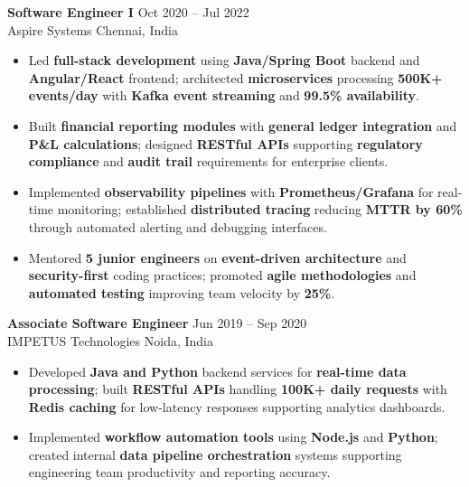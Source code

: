 \documentclass[letterpaper,10pt]{article}
\newcommand{\resumeItem}[1]{\item\small #1}
\newcommand{\resumeSubheading}[4]{
  \vspace{6pt}
  \noindent
  \textbf{#1} \hfill {\footnotesize #2} \\
  [-1pt]
  \noindent
  \small #3 \hfill {\small #4}
  \vspace{3pt}
}
\newcommand{\resumeItemsStart}{\vspace{-2pt}\begin{itemize}}
\newcommand{\resumeItemsEnd}{\end{itemize}\vspace{6pt}}
\begin{document}
\resumeSubheading
{Software Engineer I}{Oct 2020 -- Jul 2022}
{Aspire Systems}{Chennai, India}
\resumeItemsStart
\resumeItem{Led \textbf{full-stack development} using \textbf{Java/Spring Boot} backend and \textbf{Angular/React} frontend; architected \textbf{microservices} processing \textbf{500K+ events/day} with \textbf{Kafka event streaming} and \textbf{99.5\% availability}.}
\resumeItem{Built \textbf{financial reporting modules} with \textbf{general ledger integration} and \textbf{P\&L calculations}; designed \textbf{RESTful APIs} supporting \textbf{regulatory compliance} and \textbf{audit trail} requirements for enterprise clients.}
\resumeItem{Implemented \textbf{observability pipelines} with \textbf{Prometheus/Grafana} for real-time monitoring; established \textbf{distributed tracing} reducing \textbf{MTTR by 60\%} through automated alerting and debugging interfaces.}
\resumeItem{Mentored \textbf{5 junior engineers} on \textbf{event-driven architecture} and \textbf{security-first} coding practices; promoted \textbf{agile methodologies} and \textbf{automated testing} improving team velocity by \textbf{25\%}.}
\resumeItemsEnd
\vspace{-12pt}

\resumeSubheading
{Associate Software Engineer}{Jun 2019 -- Sep 2020}
{IMPETUS Technologies}{Noida, India}
\resumeItemsStart
\resumeItem{Developed \textbf{Java and Python} backend services for \textbf{real-time data processing}; built \textbf{RESTful APIs} handling \textbf{100K+ daily requests} with \textbf{Redis caching} for low-latency responses supporting analytics dashboards.}
\resumeItem{Implemented \textbf{workflow automation tools} using \textbf{Node.js} and \textbf{Python}; created internal \textbf{data pipeline orchestration} systems supporting engineering team productivity and reporting accuracy.}
\resumeItemsEnd
\vspace{-8pt}

\end{document}
